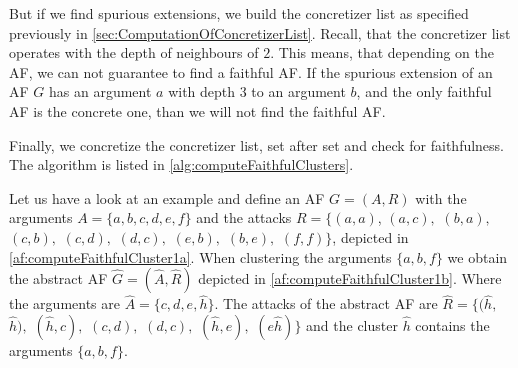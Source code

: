 But if we find spurious extensions, we build the concretizer list as specified previously in \cref{sec:ComputationOfConcretizerList}. Recall, that the concretizer list operates with the depth of neighbours of $2$. This means, that depending on the AF, we can not guarantee to find a faithful AF. If the spurious extension of an AF $G$ has an argument $a$ with depth 3 to an argument $b$, and the only faithful AF is the concrete one, than we will not find the faithful AF.

Finally, we concretize the concretizer list, set after set and check for faithfulness. The algorithm is listed in \cref{alg:computeFaithfulClusters}.



\begin{example}
    Let us have a look at an example and define an AF $G=(A,R)$ with the arguments $A=\{a, b, c, d, e, f\}$ and the attacks $R=\bigl\{(a, a)$, $(a, c),$ $(b, a),$ $(c, b),$ $(c, d),$ $(d, c),$ $(e, b),$ $(b, e),$ $(f, f)\bigl\}$, depicted in \cref{af:computeFaithfulCluster1a}. When clustering the arguments $\{a, b, f\}$ we obtain the abstract AF $\hat{G}=(\hat{A}, \hat{R})$ depicted in \cref{af:computeFaithfulCluster1b}. Where the arguments are $\hat{A}=\{c, d, e, \hat{h}\}$. The attacks of the abstract AF are $\hat{R}=\{(\hat{h},$ $\hat{h}),$ $(\hat{h}, c),$ $(c, d),$ $(d, c),$ $(\hat{h}, e),$ $(e \hat{h})\}$ and the cluster $\hat{h}$ contains the arguments $\{a, b, f\}$.
\end{example}

